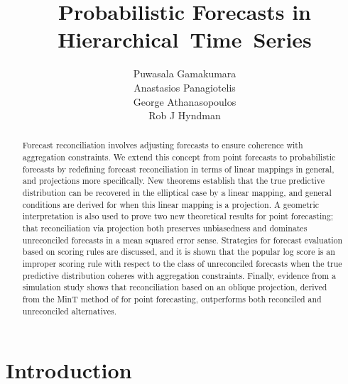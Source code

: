 \documentclass[a4paper, 11pt]{article}
\title{Probabilistic Forecasts in Hierarchical~Time~Series}
\author{Puwasala Gamakumara\\ Anastasios Panagiotelis\\ George Athanasopoulos\\ Rob J Hyndman}
\theoremstyle{definition}
\begin{document}
\maketitle

\begin{abstract}
  Forecast reconciliation involves adjusting forecasts to ensure coherence with aggregation constraints. We extend this concept from point forecasts to probabilistic forecasts by redefining forecast reconciliation in terms of linear mappings in general, and projections more specifically. New theorems establish that the true predictive distribution can be recovered in the elliptical case by a linear mapping, and general conditions are derived for when this linear mapping is a projection. A geometric interpretation is also used to prove two new theoretical results for point forecasting; that reconciliation via projection both preserves unbiasedness and dominates unreconciled forecasts in a mean squared error sense. Strategies for forecast evaluation based on scoring rules are discussed, and it is shown that the popular log score is an improper scoring rule with respect to the class of unreconciled forecasts when the true predictive distribution coheres with aggregation constraints. Finally, evidence from a simulation study shows that reconciliation based on an oblique projection, derived from the MinT method of \citet{Wickramasuriya2017} for point forecasting, outperforms both reconciled and unreconciled alternatives.
\end{abstract}

\section{Introduction}\label{sec:intro}
\end{document}

